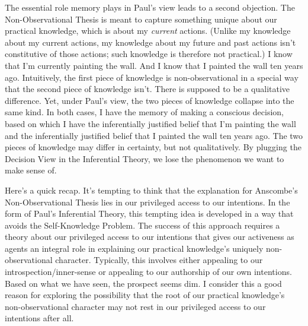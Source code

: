 \documentclass[a4paper,12pt]{article}
\begin{document}
The essential role memory plays in Paul's view leads to a second objection. The Non-Observational Thesis is meant to capture something unique about our practical knowledge, which is about my \emph{current} actions. (Unlike my knowledge about my current actions, my knowledge about my future and past actions isn't constitutive of those actions; such knowledge is therefore not practical.) I know that I'm currently painting the wall. And I know that I painted the wall ten years ago. Intuitively, the first piece of knowledge is non-observational in a special way that the second piece of knowledge isn't. There is supposed to be a qualitative difference. Yet, under Paul's view, the two pieces of knowledge collapse into the same kind. In both cases, I have the memory of making a conscious decision, based on which I have the inferentially justified belief that I'm painting the wall and the inferentially justified belief that I painted the wall ten years ago. The two pieces of knowledge may differ in certainty, but not qualitatively. By plugging the Decision View in the Inferential Theory, we lose the phenomenon we want to make sense of.

Here's a quick recap. It's tempting to think that the explanation for Anscombe's Non-Observational Thesis lies in our privileged access to our intentions. In the form of Paul's Inferential Theory, this tempting idea is developed in a way that avoids the Self-Knowledge Problem. The success of this approach requires a theory about our privileged access to our intentions that gives our activeness as agents an integral role in explaining our practical knowledge's uniquely non-observational character. Typically, this involves either appealing to our introspection/inner-sense or appealing to our authorship of our own intentions. Based on what we have seen, the prospect seems dim. I consider this a good reason for exploring the possibility that the root of our practical knowledge's non-observational character may not rest in our privileged access to our intentions after all.
\end{document}
